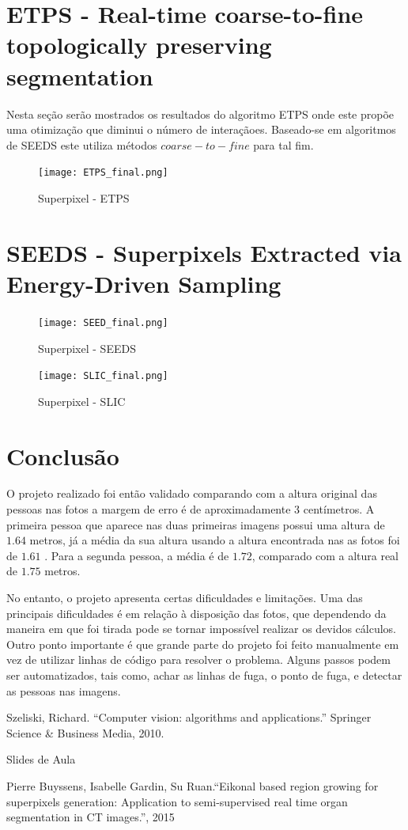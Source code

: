 \documentclass[a4paper, 12pt]{article}
\begin{document}
    \section*{ETPS - Real-time coarse-to-fine topologically preserving segmentation}
    Nesta seção serão mostrados os resultados do algoritmo ETPS onde este propõe uma otimização
    que diminui o número de interaçãoes. Baseado-se em algoritmos de SEEDS este utiliza métodos
    $coarse-to-fine$ para tal fim.

		\begin{figure}[H]
			\centering
			\texttt{[image: ETPS\_final.png]}
			\caption{Superpixel - ETPS}
		\end{figure}

    \section*{SEEDS - Superpixels Extracted via Energy-Driven Sampling}
		\begin{figure}[H]
			\centering
			\texttt{[image: SEED\_final.png]}
			\caption{Superpixel - SEEDS}
		\end{figure}

		\begin{figure}[H]
			\centering
			\texttt{[image: SLIC\_final.png]}
			\caption{Superpixel - SLIC}
		\end{figure}

    \section*{Conclusão}
        O projeto realizado foi então validado comparando com a altura original das pessoas nas fotos a margem de erro é de aproximadamente 3 centímetros. A primeira pessoa que aparece nas duas primeiras imagens possui uma altura de $1.64$ metros, já a média da sua altura usando a altura encontrada nas as fotos foi de $1.61$ . Para a segunda pessoa, a média é de $1.72$, comparado com a altura real de $1.75$ metros.

        No entanto, o projeto apresenta certas dificuldades e limitações. Uma das principais dificuldades é em relação à disposição das fotos, que dependendo da maneira em que foi tirada pode se tornar impossível realizar os devidos cálculos. Outro ponto importante é que grande parte do projeto foi feito manualmente em vez de utilizar linhas de código para resolver o problema. Alguns passos podem ser automatizados, tais como, achar as linhas de fuga, o ponto de fuga, e detectar as pessoas nas imagens.

	\begin{thebibliography}{9}

        Szeliski, Richard. ``Computer vision: algorithms and applications.'' Springer Science \& Business Media, 2010.

        Slides de Aula

        Pierre Buyssens, Isabelle Gardin, Su Ruan.``Eikonal based region growing for superpixels generation: Application to semi-supervised real time organ segmentation in CT images.'', 2015



    \end{thebibliography}
\end{document}
